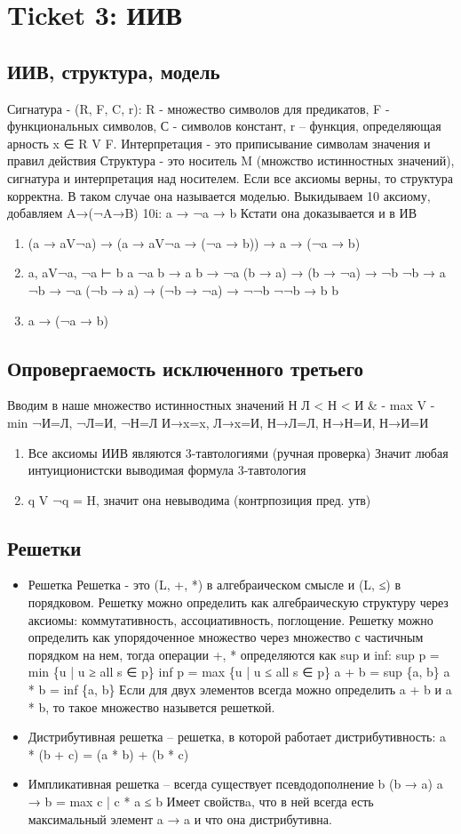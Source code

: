 \documentclass[11pt]{article}
\begin{document}
\section{Ticket 3: ИИВ}
\label{sec-5}
\subsection{ИИВ, структура, модель}
\label{sec-5-1}
Сигнатура - (R, F, C, r): R - множество символов для
предикатов, F - функциональных символов, С - символов
констант, r – функция, определяющая арность x ∈ R V F.
Интерпретация - это приписывание символам значения
и правил действия
Структура - это носитель M (множство истинностных значений),
сигнатура и интерпретация над носителем. Если все аксиомы
верны, то структура корректна. В таком случае она называется
моделью.
Выкидываем 10 аксиому, добавляем A→(¬A→B)
10i: a → ¬a → b
Кстати она доказывается и в ИВ
\begin{enumerate}
\item (a → aV¬a) → (a → aV¬a → (¬a → b)) → a → (¬a → b)
\item a, aV¬a, ¬a ⊢ b
a
¬a
b → a
b → ¬a
(b → a) → (b → ¬a) → ¬b
¬b → a
¬b → ¬a
(¬b → a) → (¬b → ¬a) → ¬¬b
¬¬b → b
b
\item a → (¬a → b)
\end{enumerate}
\subsection{Опровергаемость исключенного третьего}
\label{sec-5-2}
Вводим в наше множество истинностных значений Н
Л < Н < И
\& - max
V - min
¬И=Л, ¬Л=И, ¬Н=Л
И→x=x, Л→x=И, Н→Л=Л, Н→Н=И, Н→И=И
\begin{enumerate}
\item Все аксиомы ИИВ являются 3-тавтологиями (ручная проверка)
Значит любая интуиционистски выводимая формула 3-тавтология
\item q V ¬q = H, значит она невыводима (контрпозиция пред. утв)
\end{enumerate}
\subsection{Решетки}
\label{sec-5-3}
\begin{itemize}
\item Решетка
Решетка - это (L, +, *) в алгебраическом смысле и (L, ≤) в порядковом.
Решетку можно определить как алгебраическую структуру через
аксиомы: коммутативность, ассоциативность, поглощение.
Решетку можно определить как упорядоченное множество через
множество с частичным порядком на нем, тогда операции +, * определяются
как sup и inf:
sup p = min \{u | u ≥ all s ∈ p\}
inf p = max \{u | u ≤ all s ∈ p\}
a + b = sup \{a, b\}
a * b = inf \{a, b\}
Если для двух элементов всегда можно определить a + b и a * b, то такое
множество назывется решеткой.
\item Дистрибутивная решетка -- решетка, в которой работает дистрибутивность:
a * (b + c) = (a * b) + (b * c)
\item Импликативная решетка -- всегда существует псевдодополнение b (b → a)
a → b = max c | c * a ≤ b
Имеет свойствa, что в ней всегда есть максимальный элемент a → a и что
она дистрибутивна.
\end{itemize}
\end{document}
